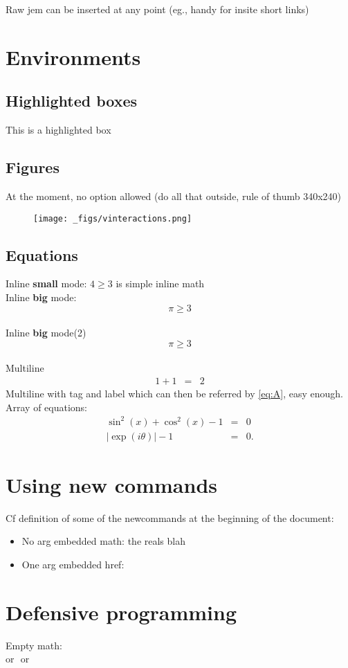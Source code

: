 Raw jem can be inserted at any point (eg., handy for insite short links)
\section{Environments}
\subsection{Highlighted boxes}
\begin{ybox} This is a highlighted box \end{ybox}

\subsection{Figures}
At the moment, no option allowed (do all that outside, rule of thumb 340x240)
\begin{figure}[!h]\center\texttt{[image: \_figs/vinteractions.png]}\end{figure}

\subsection{Equations}
Inline \textbf{small} mode: $4 \ge 3$ is simple inline math\\
Inline \textbf{big} mode:   $$\pi\ge3$$\\
Inline \textbf{big} mode(2) $$\pi\ge3$$\\
Multiline
\begin{eqnarray} 1+1&=&2\end{eqnarray}
Multiline with tag and label
which can then be referred by \eqref{eq:A}, easy enough.\\

Array of equations:
\begin{eqnarray}
    \sin^2(x)+\cos^2(x) - 1 &=& 0\nonumber\\
    |\exp(i\theta)|-1 &=& 0.
\end{eqnarray}

\section{\label{sec:newcom}Using new commands}
Cf definition of some of the newcommands at the beginning of the document:
\begin{itemize}
    \item No arg embedded math: the reals \RR blah
    \item One arg embedded href: 
\end{itemize}

\section{Defensive programming}
Empty math: $$ $$ or $ $ or \eqa{}


